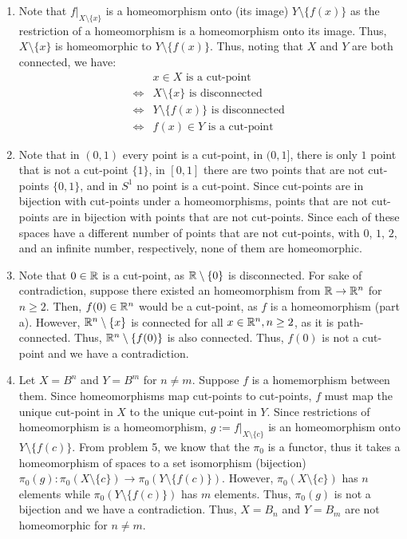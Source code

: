 \documentclass[12pt]{article}
\begin{document}
\begin{solution}
    \bbni
    \begin{enumerate}
        \item Note that $f|_{X\setminus \{x\}}$ is a homeomorphism onto (its image) $Y \setminus \{f(x)\}$ as the restriction of a homeomorphism is a homeomorphism onto its image. Thus, $X \setminus \{x\}$ is homeomorphic to $Y \setminus \{f(x)\}$. Thus, noting that $X$ and $Y$ are both connected, we have:
        \begin{align*}
            &x \in X \text{ is a cut-point } \\
            \iff &X \setminus \{x\} \text{ is disconnected } \\
            \iff &Y \setminus \{f(x)\} \text{ is disconnected } \\
            \iff &f(x) \in Y \text{ is a cut-point} 
        \end{align*}
        \item Note that in $(0, 1)$ every point is a cut-point, in $(0, 1]$, there is only $1$ point that is not a cut-point $\{1\}$, in $[0, 1]$ there are two points that are not cut-points $\{0, 1\}$, and in $S^1$ no point is a cut-point. Since cut-points are in bijection with cut-points under a homeomorphisms, points that are not cut-points are in bijection with points that are not cut-points. Since each of these spaces have a different number of points that are not cut-points, with $0$, $1$, $2$, and an infinite number, respectively, none of them are homeomorphic. 
        \item Note that $0 \in \mathbb R$ is a cut-point, as $\mathbb R \setminus \{0\}$ is disconnected. For sake of contradiction, suppose there existed an homeomorphism from $\mathbb R \to \mathbb R^n$ for $n \geq 2$. Then, $f(0) \in \mathbb R^n$ would be a cut-point, as $f$ is a homeomorphism (part a). However, $\mathbb R^n \setminus \{x\}$ is connected for all $x \in \mathbb R^n, n \geq 2$, as it is path-connected. Thus, $\mathbb R^n \setminus \{f(0)\}$ is also connected. Thus, $f(0)$ is not a cut-point and we have a contradiction.
        \item Let $X = B^n$ and $Y = B^m$ for $n \neq m$. Suppose $f$ is a homemorphism between them. Since homeomorphisms map cut-points to cut-points, $f$ must map the unique cut-point in $X$ to the unique cut-point in $Y$. Since restrictions of homeomorphism is a homeomorphism, $g := f|_{X \setminus \{c\}}$ is an homeomorphism onto $Y \setminus \{f(c)\}$. From problem 5, we know that the $\pi_0$ is a functor, thus it takes a homeomorphism of spaces to a set isomorphism (bijection) $\pi_0(g): \pi_0(X \setminus \{c\}) \to \pi_0(Y \setminus \{f(c)\})$. However, $\pi_0(X \setminus \{c\})$ has $n$ elements while $\pi_0(Y \setminus \{f(c)\})$ has $m$ elements. Thus, $\pi_0(g)$ is not a bijection and we have a contradiction. Thus, $X = B_n$ and $Y = B_m$ are not homeomorphic for $n \neq m$.
    \end{enumerate}
\end{solution}
\newpage
\end{document}
